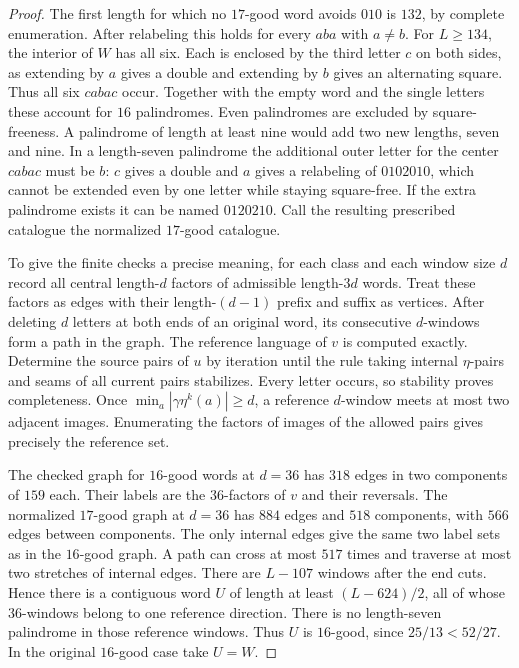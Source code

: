 \begin{proof}
The first length for which no \(17\)-good word avoids \(010\) is \(132\), by complete enumeration. After relabeling this holds for every \(aba\) with \(a\ne b\). For \(L\ge134\), the interior of \(W\) has all six. Each is enclosed by the third letter \(c\) on both sides, as extending by \(a\) gives a double and extending by \(b\) gives an alternating square. Thus all six \(cabac\) occur. Together with the empty word and the single letters these account for \(16\) palindromes. Even palindromes are excluded by square-freeness. A palindrome of length at least nine would add two new lengths, seven and nine. In a length-seven palindrome the additional outer letter for the center \(cabac\) must be \(b\): \(c\) gives a double and \(a\) gives a relabeling of \(0102010\), which cannot be extended even by one letter while staying square-free. If the extra palindrome exists it can be named \(0120210\). Call the resulting prescribed catalogue the normalized \(17\)-good catalogue.

To give the finite checks a precise meaning, for each class and each window size \(d\) record all central length-\(d\) factors of admissible length-\(3d\) words. Treat these factors as edges with their length-\((d-1)\) prefix and suffix as vertices. After deleting \(d\) letters at both ends of an original word, its consecutive \(d\)-windows form a path in the graph. The reference language of \(v\) is computed exactly. Determine the source pairs of \(u\) by iteration until the rule taking internal \(\eta\)-pairs and seams of all current pairs stabilizes. Every letter occurs, so stability proves completeness. Once \(\min_a|\gamma\eta^k(a)|\ge d\), a reference \(d\)-window meets at most two adjacent images. Enumerating the factors of images of the allowed pairs gives precisely the reference set.

The checked graph for \(16\)-good words at \(d=36\) has \(318\) edges in two components of \(159\) each. Their labels are the \(36\)-factors of \(v\) and their reversals. The normalized \(17\)-good graph at \(d=36\) has \(884\) edges and \(518\) components, with \(566\) edges between components. The only internal edges give the same two label sets as in the \(16\)-good graph. A path can cross at most \(517\) times and traverse at most two stretches of internal edges. There are \(L-107\) windows after the end cuts. Hence there is a contiguous word \(U\) of length at least \((L-624)/2\), all of whose \(36\)-windows belong to one reference direction. There is no length-seven palindrome in those reference windows. Thus \(U\) is \(16\)-good, since \(25/13<52/27\). In the original \(16\)-good case take \(U=W\).


\end{proof}
